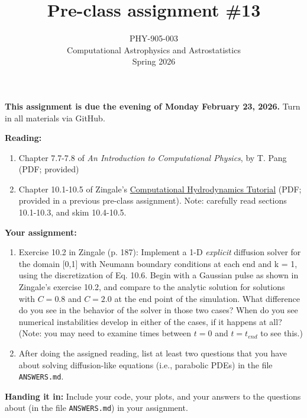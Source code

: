 \documentclass[10pt]{article}
\title{Pre-class assignment \#13}
\author{PHY-905-003\\Computational Astrophysics and
  Astrostatistics\\Spring 2026}
\date{} %
\begin{document}
 
\maketitle

\vspace{-5mm}

\noindent
\textbf{This assignment is due the evening of Monday February 23, 2026.}
 Turn in all materials via GitHub.

\vspace{5mm}

\noindent
\textbf{Reading:}

\begin{enumerate}

\item Chapter 7.7-7.8 of \textit{An Introduction to Computational Physics},
  by T. Pang (PDF; provided)

\item Chapter 10.1-10.5 of Zingale's \href{https://open-astrophysics-bookshelf.github.io/numerical_exercises/CompHydroTutorial.pdf}{Computational
  Hydrodynamics Tutorial} (PDF; provided in a previous pre-class
assignment).  Note: carefully read sections 10.1-10.3, and skim 10.4-10.5.

\end{enumerate}

\noindent
\textbf{Your assignment:}  

\begin{enumerate}

\item Exercise 10.2 in Zingale (p. 187): Implement a 1-D
\textit{explicit} diffusion solver for the domain [0,1] with Neumann
boundary conditions at each end and k = 1, using the discretization of
Eq. 10.6.  Begin with a Gaussian pulse as shown in Zingale's exercise
10.2, and compare to the analytic solution for solutions with $C =
0.8$ and $C = 2.0$ at the end point of the simulation.  What
difference do you see in the behavior of the solver in those two
cases?  When do you see numerical instabilities develop in either of
the cases, if it happens at all?  (Note: you may need to examine times
between $t=0$ and $t=t_{end}$ to see this.)

\item After doing the assigned reading, list at least two questions
that you have about solving diffusion-like equations (i.e., parabolic
PDEs) in the file \texttt{ANSWERS.md}.

\end{enumerate}

\vspace{5mm}

\noindent \textbf{Handing it in:} Include your code, your plots, and
your answers to the questions about (in the file \texttt{ANSWERS.md})
in your assignment.
\end{document}
